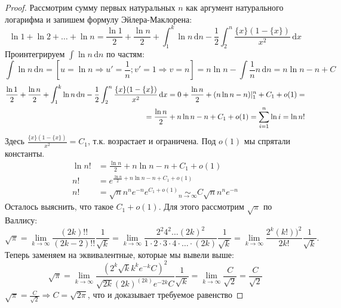 \documentclass{article}
\def\D{\,\mathrm{d}}
\begin{document}
\begin{proof}
Рассмотрим сумму первых натуральных $n$ как аргумент натурального логарифма и запишем формулу Эйлера-Маклорена:
\begin{equation*}
\ln{1} + \ln{2} + \ldots + \ln{n} = \frac{\ln{1}} {2}+ \frac{\ln{n}} {2} + \int_1^k \ln{n}\D n - \frac{1} {2} \int_2 ^n \frac{\{x\} ( 1- \{x\})} {x^2} \D x
\end{equation*}
Проинтегрируем $\int \ln{n} \D n$ по частям:
\begin{equation*}
\int \ln{n} \D n = [u = \ln{n} \Rightarrow u' = \frac{1} {n}; v' = 1 \Rightarrow v = n] = n \ln{n} - \int \frac{1} {n} n\D n = n\ln{n} - n + C
\end{equation*}
\begin{align*}
\frac{\ln{1}} {2}+ \frac{\ln{n}} {2} + \int_1^k \ln{n}\D n - \frac{1} {2} \int_2 ^n \frac{\{x\} ( 1- \{x\})} {x^2} \D x  = 0 + \frac{\ln{n}} {2} + (n\ln{n} - n)\arrowvert^n_1 + C_1 + o(1)=\\ = \frac{\ln{n}} {2} + n\ln{n} - n + C_1 + o(1) = \sum_{i = 1}^n \ln{i} = \ln{n!}
\end{align*}
Здесь $ \frac{\{x\} ( 1- \{x\})} {x^2} = C_1$, т.к. возрастает и ограничена. Под $o(1)$ мы спрятали константы.
\begin{align*}
\ln{n!} &= \frac{\ln{n}} {2} + n \ln{n} - n + C_1 + o(1)\\
n! &= e^{\frac{\ln{n}} {2} + n \ln{n} - n + C_1 + o(1)}\\
n! &= \sqrt{n} n^n e^{-n} e^{C_1 + o(1)}  \underset{n\to \infty}{\sim} C\sqrt{n}n^n e^{-n}
\end{align*}
Осталось выяснить, что такое $C_1 + o(1)$. Для этого рассмотрим $\sqrt{\pi}$ по Валлису:
\begin{equation*}
\sqrt{\pi} = \lim_{k\to\infty} \frac{(2k)!!} {(2k-2)!!} \frac{1} {\sqrt{k}} = \lim_{k\to\infty} \frac{2^2 4^2\ldots (2k)^2} {1\cdot2\cdot3\cdot4\cdot \ldots\cdot (2k)} \frac{1} {\sqrt{k}} = \lim_{k\to\infty} \frac{2^k (k!))^2} {2k!} \frac{1} {\sqrt{k}}.
\end{equation*}
Теперь заменяем на эквивалентные, которые мы вывели выше:
\begin{equation*}
\sqrt{\pi} = \lim_{k\to\infty} \frac{(2^k \sqrt{k} k^k e^{-k} C)^2} {\sqrt{2k} (2k)^{(2k)} e^{-2k} C} \frac{1} {\sqrt{k}} = \lim_{k\to\infty} \frac{C} {\sqrt{2}} = \frac{C} {\sqrt{2}}
\end{equation*}
$\sqrt{\pi} = \frac{C}{\sqrt{2}} \Rightarrow C = \sqrt{2\pi}$, что и доказывает требуемое равенство
\end{proof}
\end{document}
